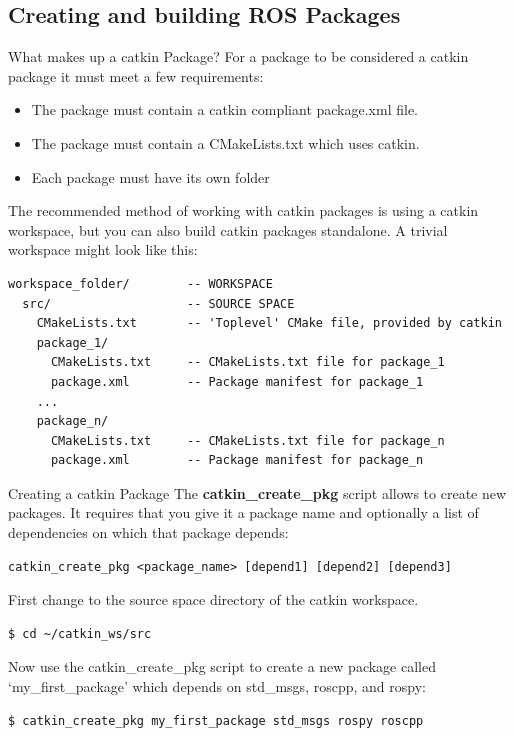 \subsection{Creating and building ROS Packages}

\begin{frame}[fragile]{What makes up a catkin Package?}
For a package to be considered a catkin package it must meet a few requirements: 
\begin{itemize}
 \item The package must contain a catkin compliant package.xml file. 
 \item The package must contain a CMakeLists.txt which uses catkin. 
 \item Each package must have its own folder 
\end{itemize}

The recommended method of working with catkin packages is using a catkin workspace, but you can also build catkin packages standalone. A trivial workspace might look like this: 
\begin{lstlisting}[language=syntax]
workspace_folder/        -- WORKSPACE
  src/                   -- SOURCE SPACE
    CMakeLists.txt       -- 'Toplevel' CMake file, provided by catkin
    package_1/
      CMakeLists.txt     -- CMakeLists.txt file for package_1
      package.xml        -- Package manifest for package_1
    ...
    package_n/
      CMakeLists.txt     -- CMakeLists.txt file for package_n
      package.xml        -- Package manifest for package_n
\end{lstlisting}
\end{frame}

\begin{frame}[fragile]{Creating a catkin Package}
The \textbf{catkin\_create\_pkg} script allows to create new packages. It requires that you give it a package name and optionally a list of dependencies on which that package depends: 

\begin{lstlisting}[language=syntax]
catkin_create_pkg <package_name> [depend1] [depend2] [depend3]
\end{lstlisting}

First change to the source space directory of the catkin workspace.

\begin{lstlisting}[language=shell]
$ cd ~/catkin_ws/src
\end{lstlisting}

Now use the catkin\_create\_pkg script to create a new package called `my\_first\_package' which depends on std\_msgs, roscpp, and rospy: 

\begin{lstlisting}[language=shell]
$ catkin_create_pkg my_first_package std_msgs rospy roscpp
\end{lstlisting}
\end{frame}

